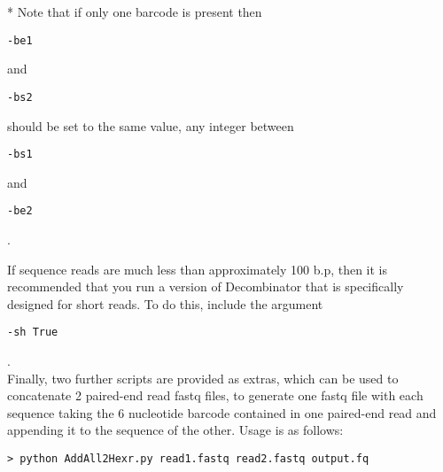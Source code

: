 \documentclass[10pt]{article}
\begin{document}
\** Note that if only one barcode is present then \begin{verbatim}-be1\end{verbatim} and \begin{verbatim}-bs2\end{verbatim} should be set to the same value, any integer between \begin{verbatim}-bs1\end{verbatim} and \begin{verbatim}-be2\end{verbatim}.

If sequence reads are much less than approximately 100 b.p, then it is recommended that you run a version of Decombinator that is specifically designed for short reads. To do this, include the argument \begin{verbatim}-sh True\end{verbatim}.\\

Finally, two further scripts are provided as extras, which can be used to concatenate 2 paired-end read fastq files, to generate one fastq file with each sequence taking the 6 nucleotide barcode contained in one paired-end read and appending it to the sequence of the other. Usage is as follows:

\footnotesize
\begin{verbatim}
> python AddAll2Hexr.py read1.fastq read2.fastq output.fq
\end{verbatim}
\normalsize
\end{document}
